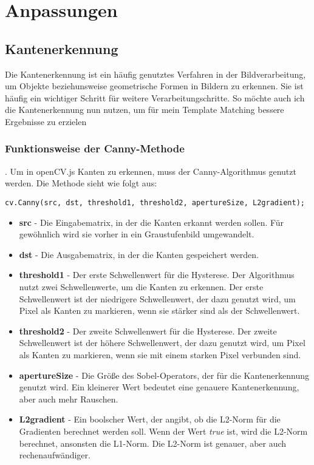 \section{Anpassungen}

\subsection{Kantenerkennung}
Die Kantenerkennung ist ein häufig genutztes Verfahren in der Bildverarbeitung, um Objekte beziehunsweise geometrische Formen in Bildern zu erkennen. Sie ist häufig ein wichtiger Schritt für weitere Verarbeitungschritte. So möchte auch ich die Kantenerkennung nun nutzen, um für mein Template Matching bessere Ergebnisse zu erzielen

\subsubsection{Funktionsweise der Canny-Methode}.
Um in openCV.js Kanten zu erkennen, muss der Canny-Algorithmus genutzt werden. Die Methode sieht wie folgt aus:
\begin{lstlisting}[style=JavaScript]
cv.Canny(src, dst, threshold1, threshold2, apertureSize, L2gradient);
\end{lstlisting}

\begin{itemize}
    \item \textbf{src} - Die Eingabematrix, in der die Kanten erkannt werden sollen. Für gewöhnlich wird sie vorher in ein Graustufenbild umgewandelt.
    \item \textbf{dst} - Die Ausgabematrix, in der die Kanten gespeichert werden.
    \item \textbf{threshold1} - Der erste Schwellenwert für die Hysterese. Der Algorithmus nutzt zwei Schwellenwerte, um die Kanten zu erkennen. Der erste Schwellenwert ist der niedrigere Schwellenwert, der dazu genutzt wird, um Pixel als Kanten zu markieren, wenn sie stärker sind als der Schwellenwert.
    \item \textbf{threshold2} - Der zweite Schwellenwert für die Hysterese. Der zweite Schwellenwert ist der höhere Schwellenwert, der dazu genutzt wird, um Pixel als Kanten zu markieren, wenn sie mit einem starken Pixel verbunden sind.
    \item \textbf{apertureSize} - Die Größe des Sobel-Operators, der für die Kantenerkennung genutzt wird. Ein kleinerer Wert bedeutet eine genauere Kantenerkennung, aber auch mehr Rauschen.
    \item \textbf{L2gradient} - Ein boolscher Wert, der angibt, ob die L2-Norm für die Gradienten berechnet werden soll. Wenn der Wert \textit{true} ist, wird die L2-Norm berechnet, ansonsten die L1-Norm. Die L2-Norm ist genauer, aber auch rechenaufwändiger.
\end{itemize}

